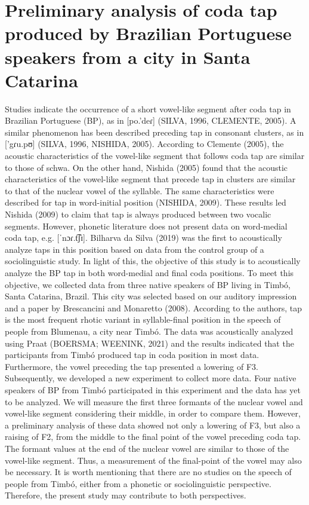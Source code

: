 \chapter{Preliminary analysis of coda tap produced by Brazilian Portuguese speakers from a city in Santa Catarina}\label{ch:matheushenriq12}
\begin{affils}
\end{affils}

Studies indicate the occurrence of a short vowel-like segment after coda tap in Brazilian Portuguese (BP), as in [po.'deɾ] (SILVA, 1996, CLEMENTE, 2005). A similar phenomenon has been described preceding tap in consonant clusters, as in ['gɾu.pʊ] (SILVA, 1996, NISHIDA, 2005). According to Clemente (2005), the acoustic characteristics of the vowel-like segment that follows coda tap are similar to those of schwa. On the other hand, Nishida (2005) found that the acoustic characteristics of the vowel-like segment that precede tap in clusters are similar to that of the nuclear vowel of the syllable. The same characteristics were described for tap in word-initial position (NISHIDA, 2009). These results led Nishida (2009) to claim that tap is always produced between two vocalic segments. However, phonetic literature does not present data on word-medial coda tap, e.g. [ˈnɔɾ.t͡ʃɪ]. Bilharva da Silva (2019) was the first to acoustically analyze taps in this position based on data from the control group of a sociolinguistic study. In light of this, the objective of this study is to acoustically analyze the BP tap in both word-medial and final coda positions. To meet this objective, we collected data from three native speakers of BP living in Timbó, Santa Catarina, Brazil. This city was selected based on our auditory impression and a paper by Brescancini and Monaretto (2008). According to the authors, tap is the most frequent rhotic variant in syllable-final position in the speech of people from Blumenau, a city near Timbó. The data was acoustically analyzed using Praat (BOERSMA; WEENINK, 2021) and the results indicated that the participants from Timbó produced tap in coda position in most data. Furthermore, the vowel preceding the tap presented a lowering of F3. Subsequently, we developed a new experiment to collect more data. Four native speakers of BP from Timbó participated in this experiment and the data has yet to be analyzed. We will measure the first three formants of the nuclear vowel and vowel-like segment considering their middle, in order to compare them. However, a preliminary analysis of these data showed not only a lowering of F3, but also a raising of F2, from the middle to the final point of the vowel preceding coda tap. The formant values at the end of the nuclear vowel are similar to those of the vowel-like segment. Thus, a measurement of the final-point of the vowel may also be necessary. It is worth mentioning that there are no studies on the speech of people from Timbó, either from a phonetic or sociolinguistic perspective. Therefore, the present study may contribute to both perspectives.


